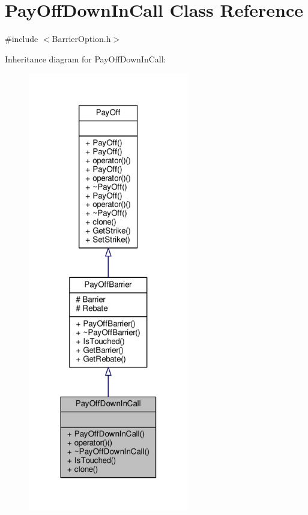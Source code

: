 \hypertarget{classPayOffDownInCall}{}\section{Pay\+Off\+Down\+In\+Call Class Reference}
\label{classPayOffDownInCall}


{\ttfamily \#include $<$Barrier\+Option.\+h$>$}



Inheritance diagram for Pay\+Off\+Down\+In\+Call\+:
\nopagebreak
\begin{figure}[H]
\begin{center}
\leavevmode
\includegraphics[width=199pt]{classPayOffDownInCall__inherit__graph}
\end{center}
\end{figure}


